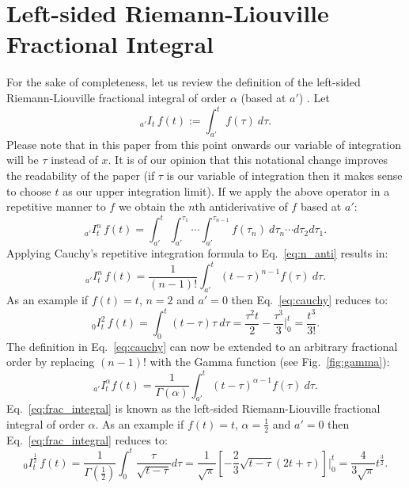 \documentclass[twoside,reqno,11pt]{fcaa-var} %
\begin{document}
\section{Left-sided Riemann-Liouville Fractional Integral}
For the sake of completeness, let us review the definition of the left-sided Riemann-Liouville fractional integral of order $\alpha$ (based at $a'$) \cite{laurent1884}. Let
\begin{equation}
_{a'}I_t\, f(t) := \int_{a'}^t f(\tau)~d\tau.
\end{equation}
Please note that in this paper from this point onwards our variable of integration will be $\tau$ instead of $x$. It is of our opinion that this notational change improves the readability of the paper (if $\tau$ is our variable of integration then it makes sense to choose $t$ as our upper integration limit). 
If we apply the above operator in a repetitive manner to $f$ we obtain the $n$th antiderivative of $f$ based at $a'$:
\begin{equation}
\label{eq:n_anti}
_{a'}I_t^n\,f(t) = \int_{a'}^t\int_{a'}^{\tau_1}\cdots \int_{a'}^{\tau_{n-1}}f(\tau_n)~d\tau_n\cdots d\tau_2 d\tau_1.
\end{equation}
Applying Cauchy's repetitive integration formula to Eq.~\eqref{eq:n_anti} results in:
\begin{equation}
\label{eq:cauchy}
_{a'}I_t^n\,f(t) = \frac{1}{(n-1)!}\int_{a'}^t (t-\tau)^{n-1}f(\tau)~d\tau.
\end{equation}
As an example if $f(t)=t$, $n=2$ and $a'=0$ then Eq.~\eqref{eq:cauchy} reduces to:
\begin{equation}
_{0}I_t^2\,f(t) = \int_0^t (t-\tau)\tau~d\tau = \frac{\tau^2 t}{2} - \frac{\tau^3}{3} \Bigg |_0^t = \frac{t^3}{3!}.
\end{equation}
The definition in Eq.~\eqref{eq:cauchy} can now be extended to an arbitrary fractional order by replacing $(n-1)!$ with the Gamma function (see Fig.~\ref{fig:gamma}):
\begin{equation}
\label{eq:frac_integral}
_{a'}I_t^{\alpha}f(t) = \frac{1}{\Gamma(\alpha)}\int_{a'}^t (t-\tau)^{\alpha-1}f(\tau)~d\tau.
\end{equation}
Eq.~\eqref{eq:frac_integral} is known as the left-sided Riemann-Liouville fractional integral of order $\alpha$. As an example if $f(t)=t$, $\alpha=\frac{1}{2}$ and $a'=0$ then 
Eq.~\eqref{eq:frac_integral} reduces to:
\begin{equation}
_0 I_t^{\frac{1}{2}}\,f(t) = \frac{1}{\Gamma(\frac{1}{2})} \int_0^t \frac{\tau}{\sqrt{t-\tau}} d\tau = \frac{1}{\sqrt{\pi}}\left [ -\frac{2}{3}\sqrt{t-\tau}(2t+\tau)\right] \Bigg |_0^t=\frac{4}{3\sqrt{\pi}}t^{\frac{3}{2}}. 
\end{equation}
\end{document}
